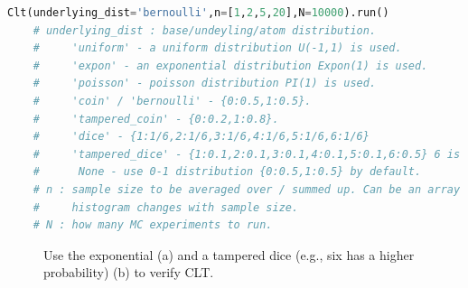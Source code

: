 \documentclass[11pt, letterpaper]{article}
\begin{document}
\lstset{
    basicstyle=\scriptsize,
    xleftmargin=-1em,,aboveskip=0.5em,belowskip=0.5em
}
\begin{lstlisting}[language=python]
    Clt(underlying_dist='bernoulli',n=[1,2,5,20],N=10000).run()
    # underlying_dist : base/undeyling/atom distribution. 
    #     'uniform' - a uniform distribution U(-1,1) is used.
    #     'expon' - an exponential distribution Expon(1) is used.
    #     'poisson' - poisson distribution PI(1) is used.
    #     'coin' / 'bernoulli' - {0:0.5,1:0.5}.
    #     'tampered_coin' - {0:0.2,1:0.8}.
    #     'dice' - {1:1/6,2:1/6,3:1/6,4:1/6,5:1/6,6:1/6}
    #     'tampered_dice' - {1:0.1,2:0.1,3:0.1,4:0.1,5:0.1,6:0.5} 6 is more likely.
    #      None - use 0-1 distribution {0:0.5,1:0.5} by default.
    # n : sample size to be averaged over / summed up. Can be an array / list, user can check how the 
    #     histogram changes with sample size.
    # N : how many MC experiments to run.
    \end{lstlisting}

\begin{figure}[!t]
    \centering
    \hfil
    \caption{Use the exponential (a) and a tampered dice (e.g., six has a higher probability) (b) to verify CLT.}
    \label{fig:clt mc}
\end{figure}



\end{document}
